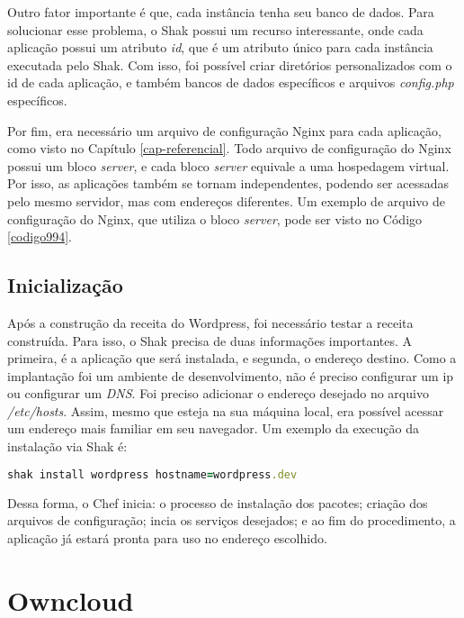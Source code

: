 Outro fator importante é que, cada instância
tenha seu banco de dados. Para
solucionar esse problema, o Shak possui um recurso interessante, onde cada aplicação
possui um atributo \textit{id}, que é um atributo único para cada instância executada pelo
Shak. Com isso, foi possível criar diretórios personalizados com o id de cada aplicação, 
e também bancos de dados específicos e arquivos \textit{config.php} específicos.

Por fim, era necessário um arquivo de configuração Nginx para cada aplicação,
como visto no Capítulo \ref{cap-referencial}. Todo arquivo de configuração
do Nginx possui um bloco \textit{server}, e cada bloco \textit{server} equivale a uma hospedagem virtual. 
Por isso, as aplicações também se tornam independentes, podendo ser acessadas pelo 
mesmo servidor, mas com endereços diferentes. Um exemplo de arquivo de configuração
do Nginx, que utiliza o bloco \textit{server}, pode ser visto no Código \ref{codigo994}.

\subsection{Inicialização}

Após a construção da receita do Wordpress, foi necessário testar a receita construída. 
Para isso, o Shak precisa de duas informações importantes. A primeira, é a aplicação
que será instalada, e segunda, o endereço destino. Como a implantação foi um ambiente de desenvolvimento,
não é preciso configurar um ip ou configurar um \textit{DNS}. Foi preciso adicionar o
endereço desejado no arquivo \textit{/etc/hosts}. Assim, mesmo que esteja na sua máquina local, 
era possível acessar um endereço mais familiar em seu navegador. Um exemplo da execução
da instalação via Shak é:

\begin{lstlisting}[language=Ruby,label=dice_index,caption={Exemplo de execução de instalação do wordpress com shak}]
shak install wordpress hostname=wordpress.dev
\end{lstlisting}

Dessa forma, o Chef inicia: o processo de instalação dos pacotes; criação dos arquivos
de configuração; incia os serviços desejados; e ao fim do procedimento, a aplicação
já estará pronta para uso no endereço escolhido.

\section{Owncloud}
\label{sub:owncloud}


